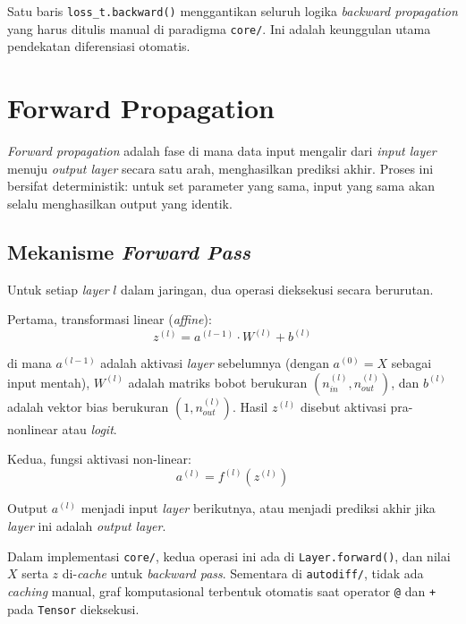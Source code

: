 Satu baris \texttt{loss\_t.backward()} menggantikan seluruh logika \textit{backward propagation} yang harus ditulis manual di paradigma \texttt{core/}. Ini adalah keunggulan utama pendekatan diferensiasi otomatis.

\section{Forward Propagation}

\textit{Forward propagation} adalah fase di mana data input mengalir dari \textit{input layer} menuju \textit{output layer} secara satu arah, menghasilkan prediksi akhir. Proses ini bersifat deterministik: untuk set parameter yang sama, input yang sama akan selalu menghasilkan output yang identik.

\subsection{Mekanisme \textit{Forward Pass}}

Untuk setiap \textit{layer} $l$ dalam jaringan, dua operasi dieksekusi secara berurutan.

Pertama, transformasi linear (\textit{affine}):
\begin{equation}
    z^{(l)} = a^{(l-1)} \cdot W^{(l)} + b^{(l)}
    \label{eq:linear}
\end{equation}

di mana $a^{(l-1)}$ adalah aktivasi \textit{layer} sebelumnya (dengan $a^{(0)} = X$ sebagai input mentah), $W^{(l)}$ adalah matriks bobot berukuran $(n_{in}^{(l)}, n_{out}^{(l)})$, dan $b^{(l)}$ adalah vektor bias berukuran $(1, n_{out}^{(l)})$. Hasil $z^{(l)}$ disebut aktivasi pra-nonlinear atau \textit{logit}.

Kedua, fungsi aktivasi non-linear:
\begin{equation}
    a^{(l)} = f^{(l)}\!\left(z^{(l)}\right)
    \label{eq:activation}
\end{equation}

Output $a^{(l)}$ menjadi input \textit{layer} berikutnya, atau menjadi prediksi akhir jika \textit{layer} ini adalah \textit{output layer}.

Dalam implementasi \texttt{core/}, kedua operasi ini ada di \texttt{Layer.forward()}, dan nilai $X$ serta $z$ di-\textit{cache} untuk \textit{backward pass}. Sementara di \texttt{autodiff/}, tidak ada \textit{caching} manual, graf komputasional terbentuk otomatis saat operator \texttt{@} dan \texttt{+} pada \texttt{Tensor} dieksekusi.

